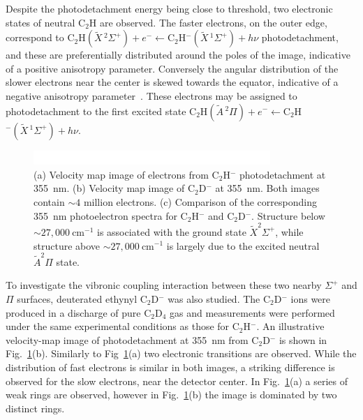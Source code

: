 \documentclass[aip,graphicx]{revtex4-1}
\begin{document}
Despite the photodetachment energy being close to threshold, two electronic states of neutral C$_2$H are observed. The faster electrons, on the outer edge, correspond to C$_2$H$(\tilde{X}\,^2\Sigma^+)+e^- \leftarrow $C$_2$H$^-(\tilde{X}\,^1\Sigma^+)+h\nu$ photodetachment, and these are preferentially distributed around the poles of the image, indicative of a positive anisotropy parameter. Conversely the angular distribution of the slower electrons near the center is skewed towards the equator, indicative of a negative anisotropy parameter~\cite{buc70}. These electrons may be assigned to photodetachment to the first excited state C$_2$H$(\tilde{A}\,^2\Pi)+e^- \leftarrow $C$_2$H$^-(\tilde{X}\,^1\Sigma^+)+h\nu$.

\begin{figure}
	\includegraphics[width=0.8\textwidth]{figures/Fig1}
	\caption{(a) Velocity map image of electrons from C$_2$H$^-$ photodetachment at 355~nm. (b) Velocity map image of C$_2$D$^-$ at 355~nm. Both images contain $\sim4$ million electrons. (c) Comparison of the corresponding 355~nm photoelectron spectra for C$_2$H$^-$ and C$_2$D$^-$. Structure below $\sim 27,000~$cm$^{-1}$ is associated with the ground state $\tilde{X} ^2\Sigma^+$, while structure above  $\sim 27,000~$cm$^{-1}$ is largely due to the excited neutral $\tilde{A} ^2\Pi$ state.}
	\label{fig:1}
\end{figure}

To investigate the vibronic coupling interaction between these two nearby $\Sigma^+$ and $\Pi$ surfaces, deuterated ethynyl C$_2$D$^-$ was also studied. The C$_2$D$^-$ ions were produced in a discharge of pure C$_2$D$_4$ gas and measurements were performed under the same experimental conditions as those for C$_2$H$^-$. An illustrative velocity-map image of photodetachment at 355~nm from C$_2$D$^-$ is shown in Fig.~\ref{fig:1}(b). Similarly to Fig~\ref{fig:1}(a) two electronic transitions are observed. While the distribution of fast electrons is similar in both images, a striking difference is observed for the slow electrons, near the detector center. In Fig.~\ref{fig:1}(a) a series of weak rings are observed, however in Fig.~\ref{fig:1}(b) the image is dominated by two distinct rings.
\end{document}
